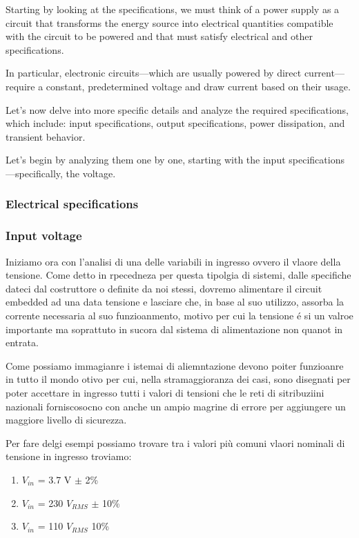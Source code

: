 \documentclass[../main.tex]{subfiles}
\begin{document}
Starting by looking at the specifications, we must think of a power supply as a circuit that transforms the energy source into electrical quantities compatible with the circuit to be powered and that must satisfy electrical and other specifications.

In particular, electronic circuits—which are usually powered by direct current—require a constant, predetermined voltage and draw current based on their usage. 

Let’s now delve into more specific details and analyze the required specifications, which include: input specifications, output specifications, power dissipation, and transient behavior.

Let’s begin by analyzing them one by one, starting with the input specifications—specifically, the voltage.

\subsubsection{Electrical specifications}


\subsubsection*{Input voltage}

Iniziamo ora con l'analisi di una delle variabili in ingresso ovvero il vlaore della tensione. Come detto in rpecedneza per questa tipolgia di sistemi, dalle specifiche dateci dal costruttore o definite da noi stessi, dovremo alimentare il circuit embedded ad una data tensione e lasciare che, in base al suo utilizzo, assorba la corrente necessaria al suo funzioanmento, motivo per cui la tensione é si un valroe importante ma soprattuto in sucora dal sistema di alimentazione non quanot in entrata.

Come possiamo immagianre i istemai di aliemntazione devono poiter funzioanre in tutto il mondo otivo per cui, nella stramaggioranza dei casi, sono disegnati per poter accettare in ingresso tutti i valori di tensioni che le reti di sitribuziini nazionali forniscosocno con anche un ampio magrine di errore per aggiungere un maggiore livello di sicurezza.

Per fare delgi esempi possiamo trovare tra i valori più comuni vlaori nominali di tensione in ingresso troviamo:

\begin{enumerate}
	\item[\textbf{-}] $V_{in}$ = 3.7 V $\pm$ 2\%
	\item[\textbf{-}] $V_{in}$ = 230 $\unit{V_{RMS}}$ $\pm$ 10\%
	\item[\textbf{-}] $V_{in}$ = 110 $\unit{V_{RMS}}$ 10\%
\end{enumerate}
\end{document}
